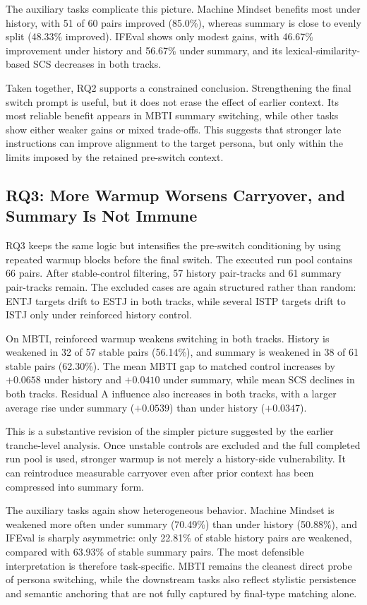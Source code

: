 \documentclass[11pt]{article}
\begin{document}
The auxiliary tasks complicate this picture.
Machine Mindset benefits most under history, with 51 of 60 pairs improved (85.0\%), whereas summary is close to evenly split (48.33\% improved).
IFEval shows only modest gains, with 46.67\% improvement under history and 56.67\% under summary, and its lexical-similarity-based SCS decreases in both tracks.

Taken together, RQ2 supports a constrained conclusion.
Strengthening the final switch prompt is useful, but it does not erase the effect of earlier context.
Its most reliable benefit appears in MBTI summary switching, while other tasks show either weaker gains or mixed trade-offs.
This suggests that stronger late instructions can improve alignment to the target persona, but only within the limits imposed by the retained pre-switch context.

\subsection{RQ3: More Warmup Worsens Carryover, and Summary Is Not Immune}

RQ3 keeps the same logic but intensifies the pre-switch conditioning by using repeated warmup blocks before the final switch.
The executed run pool contains 66 pairs.
After stable-control filtering, 57 history pair-tracks and 61 summary pair-tracks remain.
The excluded cases are again structured rather than random: ENTJ targets drift to ESTJ in both tracks, while several ISTP targets drift to ISTJ only under reinforced history control.

On MBTI, reinforced warmup weakens switching in both tracks.
History is weakened in 32 of 57 stable pairs (56.14\%), and summary is weakened in 38 of 61 stable pairs (62.30\%).
The mean MBTI gap to matched control increases by $+0.0658$ under history and $+0.0410$ under summary, while mean SCS declines in both tracks.
Residual A influence also increases in both tracks, with a larger average rise under summary ($+0.0539$) than under history ($+0.0347$).

This is a substantive revision of the simpler picture suggested by the earlier tranche-level analysis.
Once unstable controls are excluded and the full completed run pool is used, stronger warmup is not merely a history-side vulnerability.
It can reintroduce measurable carryover even after prior context has been compressed into summary form.

The auxiliary tasks again show heterogeneous behavior.
Machine Mindset is weakened more often under summary (70.49\%) than under history (50.88\%), and IFEval is sharply asymmetric: only 22.81\% of stable history pairs are weakened, compared with 63.93\% of stable summary pairs.
The most defensible interpretation is therefore task-specific.
MBTI remains the cleanest direct probe of persona switching, while the downstream tasks also reflect stylistic persistence and semantic anchoring that are not fully captured by final-type matching alone.
\end{document}

